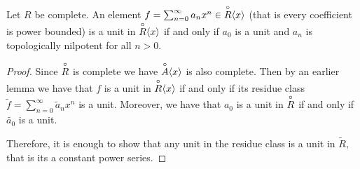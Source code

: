 \begin{lemma}
  Let $R$ be complete. An element $f = \sum_{n = 0}^\infty a_n x^n \in \overset{\circ}{R} \langle x \rangle$ (that
  is every coefficient is power bounded) is a unit in $\overset{\circ}{R} \langle x \rangle$ if and only if $a_0$
  is a unit and $a_n$ is topologically nilpotent for all $n > 0$.
\end{lemma}

\begin{proof}
  Since $\overset{\circ}{R}$ is complete we have $\overset{\circ}{A} \langle x \rangle$ is also complete. Then by an earlier
  lemma we have that $f$ is a unit in $\overset{\circ}{R} \langle x \rangle$ if and only if its residue class
  $ \tilde{f} = \sum_{n=0}^\infty \tilde{a}_n x^n$ is a unit.
  Moreover, we have that $a_0$ is a unit in $\overset{\circ}{R}$ if and only if $\tilde{a_0}$ is a unit.

  Therefore, it is enough to show that any unit in the residue class is a unit in $\tilde{R}$, that
  is its a constant power series.
\end{proof}
